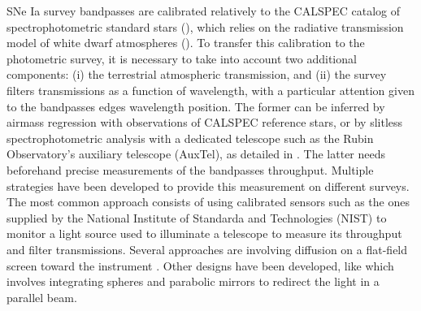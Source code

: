 SNe Ia survey bandpasses are calibrated relatively to the CALSPEC catalog of spectrophotometric standard stars (\cite{Bohlin_2020}), which relies on the radiative transmission model of white dwarf atmospheres (\cite{Narayan_2019}). To transfer this calibration to the photometric survey, it is necessary to take into account two additional components: (i) the terrestrial atmospheric transmission, and (ii) the survey filters transmissions as a function of wavelength, with a particular attention given to the bandpasses edges wavelength position. The former can be inferred by airmass regression with observations of CALSPEC reference stars, or by slitless spectrophotometric analysis with a dedicated telescope such as the Rubin Observatory's auxiliary telescope (AuxTel), as detailed in \cite{Neveu_2024}. The latter needs beforehand precise measurements of the bandpasses throughput. Multiple strategies have been developed to provide this measurement on different surveys. The most common approach consists of using calibrated sensors such as the ones supplied by the National Institute of Standarda and Technologies (NIST) \citep{houston2008detectors} to monitor a light source used to illuminate a telescope to measure its throughput and filter transmissions. Several approaches are involving diffusion on a flat-field screen toward the instrument \citep{stubbs2006,marshall2013}. Other designs have been developed, like \cite{Lombardo_2017} which involves integrating spheres and parabolic mirrors to redirect the light in a parallel beam.

